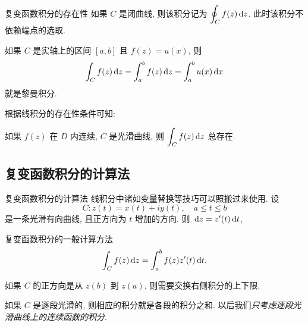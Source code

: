 \begin{frame}{复变函数积分的存在性}
	\onslide<+->
	如果 $C$ 是闭曲线, 则该积分记为 \alert{$\displaystyle\oint_Cf(z)\,\mathrm{d} z$}.
	\onslide<+->
	此时该积分不依赖端点的选取.

	\onslide<+->
	如果 $C$ 是实轴上的区间 $[a,b]$ 且 $f(z)=u(x)$, 
	\onslide<+->
	则
	\[\int_Cf(z)\,\mathrm{d} z=\int_a^bf(z)\,\mathrm{d} z=\int_a^b u(x)\,\mathrm{d} x\]
	就是黎曼积分.

	\onslide<+->
	根据线积分的存在性条件可知:
	\onslide<+->
	\begin{theorem}
	如果 $f(z)$ 在 $D$ 内连续, $C$ 是光滑曲线, 则 $\displaystyle\int_Cf(z)\,\mathrm{d} z$ 总存在.
	\end{theorem}
\end{frame}


\subsection{复变函数积分的计算法}

\begin{frame}{复变函数积分的计算法}
	\onslide<+->
	线积分中诸如变量替换等技巧可以照搬过来使用.
	\onslide<+->
	设
	\[C:z(t)=x(t)+iy(t),\quad a\le t\le b\]
	是一条光滑有向曲线, 且正方向为 $t$ 增加的方向.
	\onslide<+->
	则 $\,\mathrm{d} z=z'(t)\,\mathrm{d} t$,
	
	\onslide<+->
	\begin{alertblock}{复变函数积分的一般计算方法}
		\[\int_Cf(z)\,\mathrm{d} z=\int_a^b f(z)z'(t)\,\mathrm{d} t.\]
	\end{alertblock}
	\onslide<+->
	\noindent 如果 $C$ 的正方向是从 $z(b)$ 到 $z(a)$, 则需要交换右侧积分的上下限.

	\onslide<+->
	如果 $C$ 是逐段光滑的, 则相应的积分就是各段的积分之和.
	\onslide<+->
	以后我们\emph{只考虑逐段光滑曲线上的连续函数的积分}.
\end{frame}


